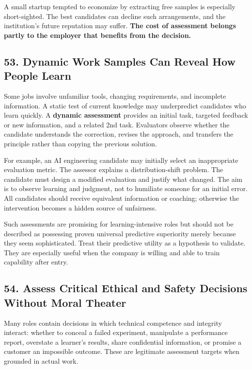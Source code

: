 A small startup tempted to economize by extracting free samples is especially short-sighted. The best candidates can decline such arrangements, and the institution's future reputation may suffer. \textbf{The cost of assessment belongs partly to the employer that benefits from the decision.}

\subsection*{53. Dynamic Work Samples Can Reveal How People Learn}

Some jobs involve unfamiliar tools, changing requirements, and incomplete information. A static test of current knowledge may underpredict candidates who learn quickly. A \textbf{dynamic assessment} provides an initial task, targeted feedback or new information, and a related 2nd task. Evaluators observe whether the candidate understands the correction, revises the approach, and transfers the principle rather than copying the previous solution.

For example, an AI engineering candidate may initially select an inappropriate evaluation metric. The assessor explains a distribution-shift problem. The candidate must design a modified evaluation and justify what changed. The aim is to observe learning and judgment, not to humiliate someone for an initial error. All candidates should receive equivalent information or coaching; otherwise the intervention becomes a hidden source of unfairness.

Such assessments are promising for learning-intensive roles but should not be described as possessing proven universal predictive superiority merely because they seem sophisticated. Treat their predictive utility as a hypothesis to validate. They are especially useful when the company is willing and able to train capability after entry.

\subsection*{54. Assess Critical Ethical and Safety Decisions Without Moral Theater}

Many roles contain decisions in which technical competence and integrity interact: whether to conceal a failed experiment, manipulate a performance report, overstate a learner's results, share confidential information, or promise a customer an impossible outcome. These are legitimate assessment targets when grounded in actual work.

